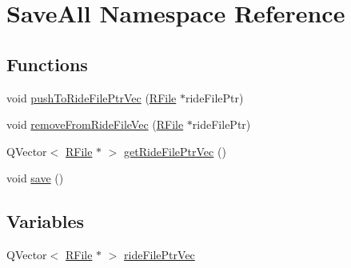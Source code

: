 \hypertarget{namespace_save_all}{\section{Save\-All Namespace Reference}
\label{namespace_save_all}
}
\subsection*{Functions}
\begin{DoxyCompactItemize}
\item 
void \hyperlink{namespace_save_all_afcb4315ac542d73a9bd3231ec9af5e14}{push\-To\-Ride\-File\-Ptr\-Vec} (\hyperlink{class_r_file}{R\-File} $\ast$ride\-File\-Ptr)
\item 
void \hyperlink{namespace_save_all_ae29e98d9ba0f52c4312dfb34abc6cc43}{remove\-From\-Ride\-File\-Vec} (\hyperlink{class_r_file}{R\-File} $\ast$ride\-File\-Ptr)
\item 
Q\-Vector$<$ \hyperlink{class_r_file}{R\-File} $\ast$ $>$ \hyperlink{namespace_save_all_a32821e6c84bd1af6a254c5ef0d15f757}{get\-Ride\-File\-Ptr\-Vec} ()
\item 
void \hyperlink{namespace_save_all_ab76b15aa70cf0227fe2ff3c83980d9fc}{save} ()
\end{DoxyCompactItemize}
\subsection*{Variables}
\begin{DoxyCompactItemize}
\item 
Q\-Vector$<$ \hyperlink{class_r_file}{R\-File} $\ast$ $>$ \hyperlink{namespace_save_all_a7571694eeff65421df3576ca43e3062e}{ride\-File\-Ptr\-Vec}
\end{DoxyCompactItemize}


